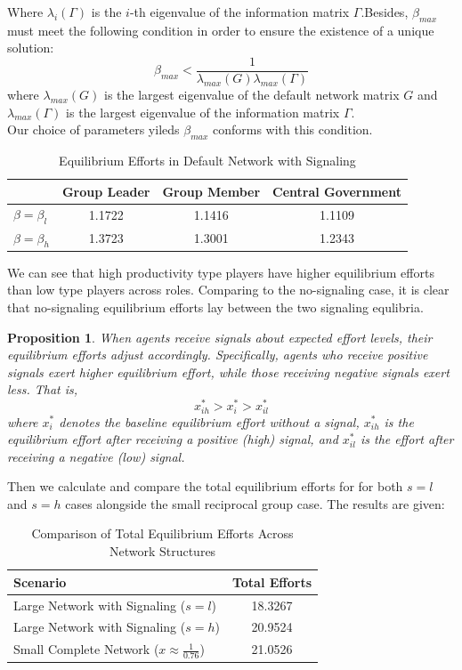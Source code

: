 \documentclass[12pt]{article}
\newtheorem{proposition}{Proposition}
\begin{document}
  Where $\lambda_i(\Gamma)$ is the $i$-th eigenvalue of the information matrix $\Gamma$.Besides, $\beta_{max}$ must meet the following condition in order to ensure the existence of a unique solution:
\[
\beta_{max} < \frac{1}{\lambda_{max}(G)\lambda_{max}(\Gamma)}
\] 
  where $\lambda_{max}(G)$ is the largest eigenvalue of the default network matrix $G$  and $\lambda_{max}(\Gamma)$ is the largest eigenvalue of the information matrix $\Gamma$.\\
Our choice of parameters yileds $\beta_{max}$ conforms with this condition. \\
\begin{table}[H]
  \centering
  \caption{Equilibrium Efforts in Default Network with Signaling}
  \begin{tabular}{lccc}
  \toprule
   & \textbf{Group Leader} & \textbf{Group Member} & \textbf{Central Government} \\
  \midrule
  \(\beta = \beta_l\) & 1.1722 & 1.1416 & 1.1109 \\
  \(\beta = \beta_h\) & 1.3723 & 1.3001 & 1.2343 \\
  \bottomrule
  \end{tabular}
  \end{table}
  We can see that high productivity type players have higher equilibrium efforts than low type players across roles. Comparing to the no-signaling case, it is clear that no-signaling equilibrium efforts lay between the two signaling equlibria. 
  \begin{proposition}
    When agents receive signals about expected effort levels, their equilibrium efforts adjust accordingly. Specifically, agents who receive positive signals exert higher equilibrium effort, while those receiving negative signals exert less. That is,
    \[
    x^*_{ih} > x^*_i > x^*_{il}
    \]
    where \( x^*_i \) denotes the baseline equilibrium effort without a signal, \( x^*_{ih} \) is the equilibrium effort after receiving a positive (high) signal, and \( x^*_{il} \) is the effort after receiving a negative (low) signal.
    \end{proposition}
Then we calculate and compare the total equilibrium efforts for for both $s=l$ and $s=h$ cases alongside the small reciprocal group case. The results are given:
\begin{table}[H]
  \centering
  \caption{Comparison of Total Equilibrium Efforts Across Network Structures}
  \begin{tabular}{l c}
  \toprule
  \textbf{Scenario} & \textbf{Total Efforts} \\
  \midrule
  Large Network with Signaling (\( s = l \)) & 18.3267 \\
  Large Network with Signaling (\( s = h \)) & 20.9524 \\
  Small Complete Network (\( x \approx \frac{1}{0.76} \)) & 21.0526 \\
  \bottomrule
  \end{tabular}
  \end{table}
\end{document}
